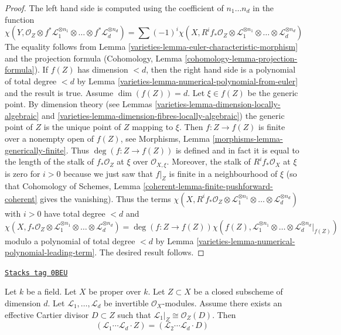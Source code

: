 \begin{proof}

The left hand side is computed using the coefficient of $n_1 \ldots n_d$
in the function
$$
\chi(Y, \mathcal{O}_Z \otimes f^*\mathcal{L}_1^{\otimes n_1} \otimes
\ldots \otimes f^*\mathcal{L}_d^{\otimes n_d}) =
\sum (-1)^i
\chi(X, R^if_*\mathcal{O}_Z \otimes
\mathcal{L}_1^{\otimes n_1} \otimes \ldots \otimes
\mathcal{L}_d^{\otimes n_d})
$$
The equality follows from Lemma \ref{varieties-lemma-euler-characteristic-morphism}
and the projection formula
(Cohomology, Lemma \ref{cohomology-lemma-projection-formula}).
If $f(Z)$ has dimension $< d$, then the right hand side
is a polynomial of total degree $< d$ by
Lemma \ref{varieties-lemma-numerical-polynomial-from-euler}
and the result is true. Assume $\dim(f(Z)) = d$. Let
$\xi \in f(Z)$ be the generic point. By
dimension theory (see Lemmas \ref{varieties-lemma-dimension-locally-algebraic} and
\ref{varieties-lemma-dimension-fibres-locally-algebraic})
the generic point of $Z$ is the unique point of $Z$ mapping to $\xi$.
Then $f : Z \to f(Z)$ is finite over a nonempty open of $f(Z)$, see
Morphisms, Lemma \ref{morphisms-lemma-generically-finite}.
Thus $\deg(f : Z \to f(Z))$ is defined and in fact it is equal
to the length of the stalk of $f_*\mathcal{O}_Z$ at $\xi$
over $\mathcal{O}_{X, \xi}$. Moreover, the stalk of
$R^if_*\mathcal{O}_X$ at $\xi$ is zero for $i > 0$ because
we just saw that $f|_Z$ is finite in a neighbourhood of $\xi$
(so that Cohomology of Schemes, Lemma
\ref{coherent-lemma-finite-pushforward-coherent} gives the vanishing).
Thus the terms $\chi(X, R^if_*\mathcal{O}_Z \otimes
\mathcal{L}_1^{\otimes n_1} \otimes \ldots \otimes
\mathcal{L}_d^{\otimes n_d})$ with $i > 0$ have total
degree $< d$ and
$$
\chi(X, f_*\mathcal{O}_Z \otimes
\mathcal{L}_1^{\otimes n_1} \otimes \ldots \otimes
\mathcal{L}_d^{\otimes n_d})
=
\deg(f : Z \to f(Z)) \chi(f(Z),
\mathcal{L}_1^{\otimes n_1} \otimes \ldots \otimes
\mathcal{L}_d^{\otimes n_d}|_{f(Z)})
$$
modulo a polynomial of total degree $< d$ by
Lemma \ref{varieties-lemma-numerical-polynomial-leading-term}.
The desired result follows.
\end{proof}

\begin{lemma}
\label{varieties-lemma-numerical-intersection-effective-Cartier-divisor}
\href{https://stacks.math.columbia.edu/tag/0BEU}{\texttt{Stacks tag 0BEU}}

Let $k$ be a field. Let $X$ be proper over $k$. Let $Z \subset X$ be
a closed subscheme of dimension $d$. Let $\mathcal{L}_1, \ldots, \mathcal{L}_d$
be invertible $\mathcal{O}_X$-modules. Assume there exists an
effective Cartier divisor $D \subset Z$ such that
$\mathcal{L}_1|_Z \cong \mathcal{O}_Z(D)$. Then
$$
(\mathcal{L}_1 \cdots \mathcal{L}_d \cdot Z) =
(\mathcal{L}_2 \cdots \mathcal{L}_d \cdot D)
$$
\end{lemma}

